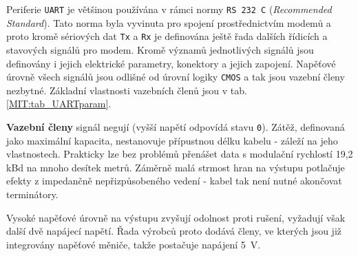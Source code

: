         Periferie \texttt{UART} je většinou používána v rámci normy \texttt{RS 232 C}
        (\emph{Recommended Standard}). Tato norma byla vyvinuta pro spojení prostřednictvím modemů a
        proto kromě sériových dat \texttt{Tx} a \texttt{Rx} je definována ještě řada dalších
        řídicích a stavových signálů pro modem. Kromě významů jednotlivých signálů jsou definovány i
        jejich elektrické parametry, konektory a jejich zapojení. Napěťové úrovně všech signálů jsou
        odlišné od úrovní logiky \texttt{CMOS} a tak jsou vazební členy nezbytné. Základní
        vlastnosti vazebních členů jsou v tab. \ref{MIT:tab_UARTparam}.
        
        \textbf{Vazební členy} signál negují (vyšší napětí odpovídá stavu \texttt{0}). Zátěž,
        definovaná jako maximální kapacita, nestanovuje přípustnou délku kabelu - záleží na jeho
        vlastnostech. Prakticky lze bez problémů přenášet data s modulační rychlostí 19,2 kBd na
        mnoho desítek metrů. Záměrně malá strmost hran na výstupu potlačuje efekty z impedančně
        nepřizpůsobeného vedení - kabel tak není nutné akončovat terminátory.
        
        \begin{table}[ht!]
          \centering
          \caption{Elektrické parametry vazebních členů \texttt{RS 232}}
          \label{MIT:tab_UARTparam}
        \end{table}
                  
        Vysoké napěťové úrovně na výstupu zvyšují odolnost proti rušení, vyžadují však další dvě 
        napájecí napětí. Řada výrobců proto dodává členy, ve kterých jsou již integrovány napěťové 
        měniče, takže postačuje napájení \SI{5}{\volt}.
        
